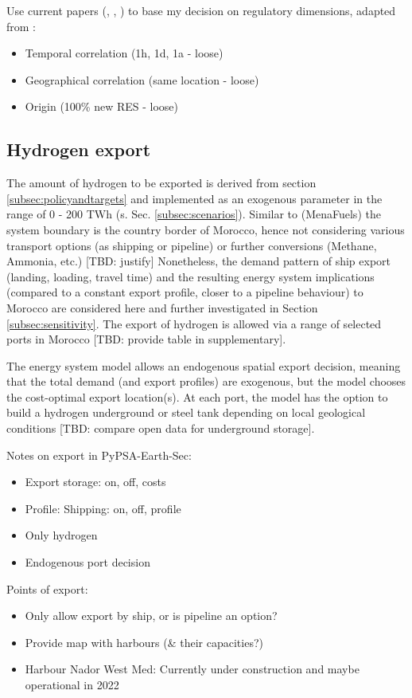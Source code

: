 Use current papers (\cite{Brauer2022}, \cite{Ruhnau2022}, \cite{Zeyen2022}) to base my decision on
regulatory dimensions, adapted from \cite{Brauer2022}:
\begin{itemize}
    \item Temporal correlation (1h, 1d, 1a - loose) 
    \item Geographical correlation (same location - loose)
    \item Origin (100\% new RES - loose)
\end{itemize}


\subsection{Hydrogen export}
\label{subsec:hydrogen_export}
The amount of hydrogen to be exported is derived from section \ref{subsec:policyandtargets} and implemented as an exogenous parameter in the range of 0 - 200 TWh (s. Sec. \ref{subsec:scenarios}). Similar to (MenaFuels) \cite{Ersoy2022} the system boundary is the country border of Morocco, hence not considering various transport options (as shipping or pipeline) or further conversions (Methane, Ammonia, etc.) [TBD: justify]
Nonetheless, the demand pattern of ship export (landing, loading, travel time) and the resulting energy system implications (compared to a constant export profile, closer to a pipeline behaviour) to Morocco are considered here and further investigated in Section \ref{subsec:sensitivity}.
The export of hydrogen is allowed via a range of selected ports in Morocco [TBD: provide table in supplementary]. 

The energy system model allows an endogenous spatial export decision, meaning that the total demand (and export profiles) are exogenous, but the model chooses the  cost-optimal export location(s). At each port, the model has the option to build a hydrogen underground or steel tank depending on local geological conditions [TBD: compare open data for underground storage].

Notes on export in PyPSA-Earth-Sec:
\begin{itemize}
    \item Export storage: on, off, costs
    \item Profile: Shipping: on, off, profile
    \item Only hydrogen
    \item Endogenous port decision
\end{itemize}

Points of export:
\begin{itemize}
    \item Only allow export by ship, or is pipeline an option?
    \item Provide map with harbours (\& their capacities?)
    \item Harbour Nador West Med: Currently under construction and maybe operational in 2022 \cite{Ersoy2022}
\end{itemize}


